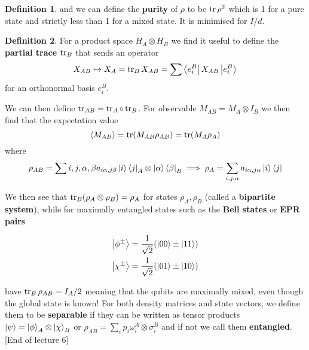 \documentclass{article}
\theoremstyle{definition}
\newtheorem{definition}{Definition}
\begin{document}
\begin{definition}
and we can define the \textbf{purity} of $\rho$ to be $\tr \rho^2$ which is 1
for a pure state and strictly less than 1 for a mixed state. It is minimised for
$I / d$.
\end{definition}

\begin{definition}
  For a product space $H_A \otimes H_B$ we find it useful to define the
  \textbf{partial trace} $\tr_B$ that sends an operator
  \begin{equation}
    X_{AB} \mapsto X_A = \tr_B X_{AB} = \sum \bra{e_i^B} X_{AB} \ket{e_i^B}
  \end{equation}
  for an orthonormal basis $e_i^B$.
\end{definition}

We can then define $\tr_{AB} = \tr_A \circ \tr_B$. For observable $M_{AB} = M_A
\otimes I_B$ we then find that the expectation value
\begin{equation}
\langle M_{AB} \rangle = \tr(M_{AB} \rho_{AB}) = \tr(M_A \rho_A)
\end{equation}
where
\begin{equation}
\rho_{AB} = \sum{i,j,\alpha,\beta} a_{i\alpha, j\beta} \ket{i}\bra{j}_A \otimes
\ket{\alpha}\bra{\beta}_B 
\implies \rho_A = \sum_{i, j, \alpha} a_{i\alpha, j\alpha} \ket{i}\bra{j}
\end{equation}

We then see that $\tr_B(\rho_A \otimes \rho_B) = \rho_A$ for states $\rho_A,
\rho_B$ (called a \textbf{bipartite system}), while for maximally entangled
states such as the \textbf{Bell states} or \textbf{EPR pairs}

\begin{align}
\ket{\phi^\pm} = \frac{1}{\sqrt{2}} (\ket{00} \pm \ket{11}) \\
\ket{\chi^\pm} = \frac{1}{\sqrt{2}} (\ket{01} \pm \ket{10})
\end{align}

have $\tr_B \rho_{AB} = I_A / 2$ meaning that the qubits are maximally mixed,
even though the global state is known! For both density matrices and state
vectors, we define them to be \textbf{separable} if they can be written as
tensor products $\ket{\psi} = \ket{\phi}_A \otimes \ket{\chi}_B$ or $\rho_{AB} =
\sum_i p_i \omega_i^A \otimes \sigma_i^B$ and if not we call them
\textbf{entangled}. [End of lecture 6]
\end{document}
